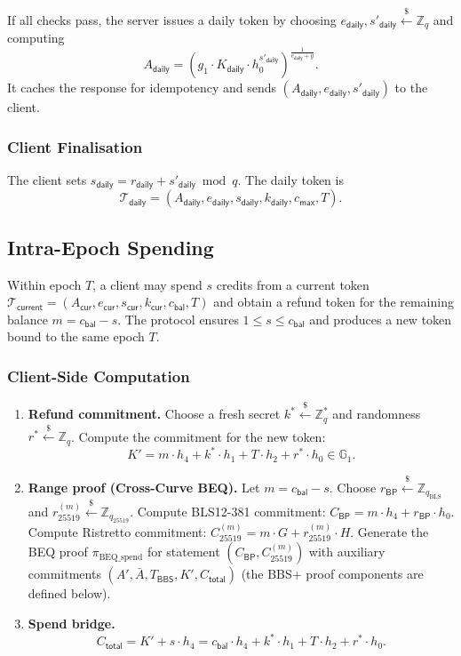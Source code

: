 \documentclass[11pt]{article}
\theoremstyle{definitionstyle}
\theoremstyle{plain}
\begin{document}
If all checks pass, the server issues a daily token by choosing $e_{\mathsf{daily}}, s'_{\mathsf{daily}} \xleftarrow{\$} \mathbb{Z}_q$ and computing
\[
A_{\mathsf{daily}} = \left( g_1 \cdot K_{\mathsf{daily}} \cdot h_0^{s'_{\mathsf{daily}}} \right)^{\frac{1}{e_{\mathsf{daily}} + y}}.
\]
It caches the response for idempotency and sends $(A_{\mathsf{daily}}, e_{\mathsf{daily}}, s'_{\mathsf{daily}})$ to the client.

\subsubsection{Client Finalisation}
The client sets $s_{\mathsf{daily}} = r_{\mathsf{daily}} + s'_{\mathsf{daily}} \bmod q$. The daily token is
\[
\mathcal{T}_{\mathsf{daily}} = (A_{\mathsf{daily}}, e_{\mathsf{daily}}, s_{\mathsf{daily}}, k_{\mathsf{daily}}, c_{\mathsf{max}}, T).
\]

\subsection{Intra-Epoch Spending}
Within epoch $T$, a client may spend $s$ credits from a current token $\mathcal{T}_{\mathsf{current}} = (A_{\mathsf{cur}}, e_{\mathsf{cur}}, s_{\mathsf{cur}}, k_{\mathsf{cur}}, c_{\mathsf{bal}}, T)$ and obtain a refund token for the remaining balance $m = c_{\mathsf{bal}} - s$. The protocol ensures $1 \le s \le c_{\mathsf{bal}}$ and produces a new token bound to the same epoch $T$.

\subsubsection{Client-Side Computation}
\begin{enumerate}[leftmargin=*]
\item \textbf{Refund commitment.}
  Choose a fresh secret $k^* \xleftarrow{\$} \mathbb{Z}_q^*$ and randomness $r^* \xleftarrow{\$} \mathbb{Z}_q$. Compute the commitment for the new token:
  \[
  K' = m \cdot h_4 + k^* \cdot h_1 + T \cdot h_2 + r^* \cdot h_0 \in \mathbb{G}_1.
  \]
\item \textbf{Range proof (Cross-Curve BEQ).}
  Let $m = c_{\mathsf{bal}} - s$.
  Choose $r_{\mathsf{BP}} \xleftarrow{\$} \mathbb{Z}_{q_{\text{BLS}}}$ and $r_{25519}^{(m)} \xleftarrow{\$} \mathbb{Z}_{q_{25519}}$.
  Compute BLS12-381 commitment: $C_{\mathsf{BP}} = m \cdot h_4 + r_{\mathsf{BP}} \cdot h_0$.
  Compute Ristretto commitment: $C_{25519}^{(m)} = m \cdot G + r_{25519}^{(m)} \cdot H$.
  Generate the BEQ proof $\pi_{\text{BEQ\_spend}}$ for statement $(C_{\mathsf{BP}}, C_{25519}^{(m)})$ with auxiliary commitments $(A', \bar{A}, T_{\mathsf{BBS}}, K', C_{\mathsf{total}})$ (the BBS+ proof components are defined below).
\item \textbf{Spend bridge.}
  \[
  C_{\mathsf{total}} = K' + s \cdot h_4 = c_{\mathsf{bal}} \cdot h_4 + k^* \cdot h_1 + T \cdot h_2 + r^* \cdot h_0.
  \]
\end{enumerate}
\end{document}
